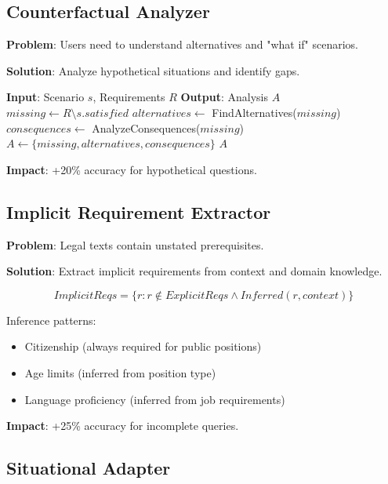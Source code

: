 \documentclass[12pt,a4paper]{article}
\begin{document}
\subsection{Counterfactual Analyzer}

\textbf{Problem}: Users need to understand alternatives and "what if" scenarios.

\textbf{Solution}: Analyze hypothetical situations and identify gaps.

\begin{algorithm}
\caption{Counterfactual Analysis}
\begin{algorithmic}
\STATE \textbf{Input}: Scenario $s$, Requirements $R$
\STATE \textbf{Output}: Analysis $A$
\STATE
\STATE $missing \gets R \setminus s.satisfied$
\STATE $alternatives \gets$ FindAlternatives($missing$)
\STATE $consequences \gets$ AnalyzeConsequences($missing$)
\STATE $A \gets \{missing, alternatives, consequences\}$
\RETURN $A$
\end{algorithmic}
\end{algorithm}

\textbf{Impact}: +20\% accuracy for hypothetical questions.


\subsection{Implicit Requirement Extractor}

\textbf{Problem}: Legal texts contain unstated prerequisites.

\textbf{Solution}: Extract implicit requirements from context and domain knowledge.

\begin{equation}
ImplicitReqs = \{r : r \notin ExplicitReqs \land Inferred(r, context)\}
\end{equation}

Inference patterns:
\begin{itemize}
    \item Citizenship (always required for public positions)
    \item Age limits (inferred from position type)
    \item Language proficiency (inferred from job requirements)
\end{itemize}

\textbf{Impact}: +25\% accuracy for incomplete queries.

\subsection{Situational Adapter}
\end{document}
